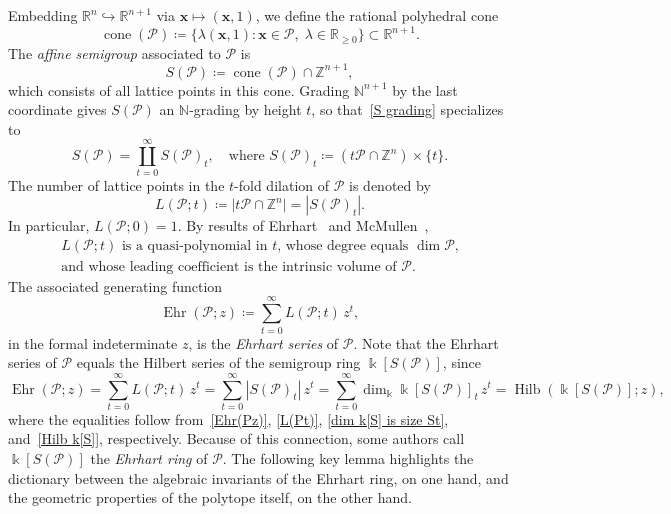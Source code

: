 \documentclass[noamsfonts,10pt]{amsart}
\newcommand{\N}{\mathbb{N}}
\newcommand{\R}{\mathbb{R}}
\renewcommand{\P}{\mathcal{P}}
\renewcommand{\k}{\Bbbk}
\DeclareMathOperator{\Ehr}{Ehr}
\DeclareMathOperator{\Hilb}{Hilb}
\DeclareMathOperator{\cone}{cone}
\newcommand{\1}{\mathbf{1}}
\theoremstyle{plain}
\theoremstyle{definition}
\numberwithin{equation}{section}
\begin{document}
Embedding $\R^n \hookrightarrow \R^{n+1}$ via $\mathbf{x} \mapsto (\mathbf{x},1)$, we define the rational polyhedral cone
\begin{equation}
    \label{cone P}
    \cone(\P) \coloneqq \big\{ \lambda(\mathbf{x},1) : \mathbf{x} \in \P, \; \lambda \in
    \R_{\ge 0} \big\} \subset \R^{n+1}.
\end{equation}
The \emph{affine semigroup} associated to $\P$ is
\begin{equation}
    \label{S(P)}
    S(\P) \coloneqq \cone(\P) \cap \mathbb{Z}^{n+1},
\end{equation}
which consists of all lattice points in this cone.
Grading $\N^{n+1}$ by the last coordinate gives $S(\P)$ an $\N$-grading by
height $t$, so that~\eqref{S grading} specializes to
\begin{equation}
    \label{S(P) grading}
    S(\P) = \coprod_{t=0}^\infty S(\P)_t, \quad \text{where }
  S(\P)_t \coloneqq (t \P \cap \mathbb{Z}^n) \times \{t\}.
\end{equation}
The number of lattice points in the $t$-fold dilation of $\P$ is denoted by
\begin{equation}
    \label{L(Pt)}
    L(\P;t) \coloneqq \bigl| t \P \cap \mathbb{Z}^n \bigr| = \left|  S(\P)_t \right|.
\end{equation}
In particular, $L(\P;0) = 1$.
By results of Ehrhart~\cite{Ehrhart62} and McMullen~\cite{McMullen78}, 
\begin{equation}
    \label{L quasi-poly}
    \begin{array}{l}
    \text{$L(\P;t)$ is a quasi-polynomial in $t$, whose degree equals $\dim \P$,} \\
    \text{and whose leading coefficient is the intrinsic volume of $\P$}.
    \end{array}
\end{equation}
The associated generating function
\begin{equation}
    \label{Ehr(Pz)}
    \Ehr(\P;z) \coloneqq \sum_{t=0}^\infty L(\P;t)\, z^t,
\end{equation}
in the formal indeterminate $z$,
is the \emph{Ehrhart series} of $\P$.
Note that the Ehrhart series of $\P$ equals the Hilbert series of the semigroup ring $\k[S(\P)]$, since
\begin{equation}
    \label{Ehr Hilb}
    \Ehr(\P;z) = \sum_{t=0}^\infty L(\P;t) \, z^t = \sum_{t=0}^\infty \left| S(\P)_t \right| \, z^t = \sum_{t=0}^\infty \dim_{\k} \k[S(\P)]_t \, z^t = \Hilb(\k[S(\P)]; z),
\end{equation}
where the equalities follow from~\eqref{Ehr(Pz)}, \eqref{L(Pt)}, \eqref{dim k[S] is size St}, and~\eqref{Hilb k[S]}, respectively.
Because of this connection, some authors call $\k[S(\P)]$ the \emph{Ehrhart ring} of $\P$.
The following key lemma highlights the dictionary between the algebraic invariants of the Ehrhart ring, on one hand, and the geometric properties of the polytope itself, on the other hand.
\end{document}
